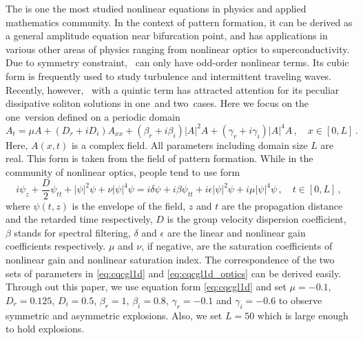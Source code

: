 The \cGLe{} is one the most studied nonlinear equations in physics 
and applied mathematics community. 
In the context of pattern formation, 
it can be derived as a general amplitude equation near bifurcation point, and 
has applications in various other areas of physics
ranging from nonlinear optics to
superconductivity. Due to symmetry constraint, \cGLe\ can only 
have odd-order nonlinear terms. Its cubic form
is frequently used to study turbulence and intermittent traveling waves. 
Recently, however, \cGLe\ with a quintic term has attracted attention for its peculiar 
dissipative soliton solutions  in one\dmn\ and two\dmn\
cases. 
Here we focus on the
one\dmn\ version defined on a periodic domain
\begin{equation}
  \label{eq:cqcgl1d}
  A_t  = \mu A + (D_r + iD_i) A_{xx} + (\beta_r + i\beta_i)|A|^2A 
         + (\gamma_r + i\gamma_i)|A|^4A 
  \,,\quad x\in[0,L]
  \,.
\end{equation}
Here, $A(x,t)$ is a complex field. All parameters including domain size
$L$ are real. This form is taken from the field of pattern formation. 
While in the community of nonlinear optics, people tend to use form
\begin{equation}
  i \psi_z + \frac{D}{2} \psi_{tt} + |\psi|^2\psi + \nu  |\psi|^4\psi
  = i \delta \psi +  i\beta \psi_{tt}  + i\epsilon |\psi|^2\psi 
    +  i \mu  |\psi|^4\psi 
      \,,\quad t\in[0,L]
      \,,
  \label{eq:cqcgl1d_optics}
\end{equation}
where $\psi(t, z)$ is the envelope of the field, $z$ and $t$ are the propagation distance
and the retarded time respectively, $D$ is the group velocity dispersion coefficient,
$\beta$ stands for spectral filtering, 
$\delta$ and $\epsilon$ are the linear and nonlinear gain coefficients respectively.
$\mu $ and $\nu$, if negative, are the saturation coefficients of nonlinear gain and
nonlinear saturation index. The correspondence of the two sets of parameters in
\eqref{eq:cqcgl1d} and \eqref{eq:cqcgl1d_optics} can be 
derived easily. Through out this paper, we use equation form 
\eqref{eq:cqcgl1d} and set 
$\mu = -0.1$, $D_r = 0.125$, $D_i = 0.5$, $\beta_r = 1$, $\beta_i = 0.8$, 
$\gamma_r = -0.1$ and $\gamma_i = -0.6$ to
observe symmetric and asymmetric explosions. Also, we set $L=50$ which is large 
enough to hold explosions.